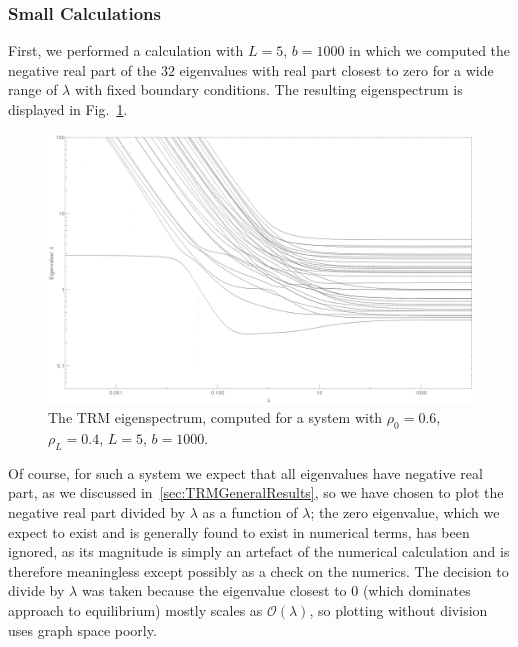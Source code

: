  \subsubsection{Small Calculations}
 First, we performed a calculation with $L=5$, $b=1000$ in which we computed the
 negative real part of the $32$ eigenvalues with real part closest to zero for a wide range of $\lambda$ with fixed
 boundary conditions. The resulting eigenspectrum is displayed in
 Fig.~\ref{fig:eigsL5B1000}.
 \begin{figure}[!ht]
 \caption[The TRM eigenspectrum for a system with $L=5$, $b=1000$.]{\label{fig:eigsL5B1000} 
 The TRM eigenspectrum, computed for a system with $\rho_0 = 0.6$, $\rho_L = 0.4$,
 $L=5$, $b=1000$.
 }
  \begin{center}
 \includegraphics[width=0.9\textheight, angle=270]{TRM/images/singleMultEigB1000L5}
  \end{center}
\end{figure}
Of course, for such a system we expect that all eigenvalues have negative real part,
as we discussed in~\ref{sec:TRMGeneralResults}, so we have chosen to plot the
negative real part divided by $\lambda$ as a function of $\lambda$; the zero eigenvalue,
which we expect to exist and is generally found to exist in numerical terms, has been ignored, as its magnitude is simply an artefact of the numerical calculation and
is therefore meaningless except possibly as a check on the numerics. The decision 
to divide by $\lambda$ was taken because the eigenvalue closest to $0$ (which dominates
approach to equilibrium) mostly scales as $\mathcal{O}(\lambda)$, so plotting without division
uses graph space poorly.


